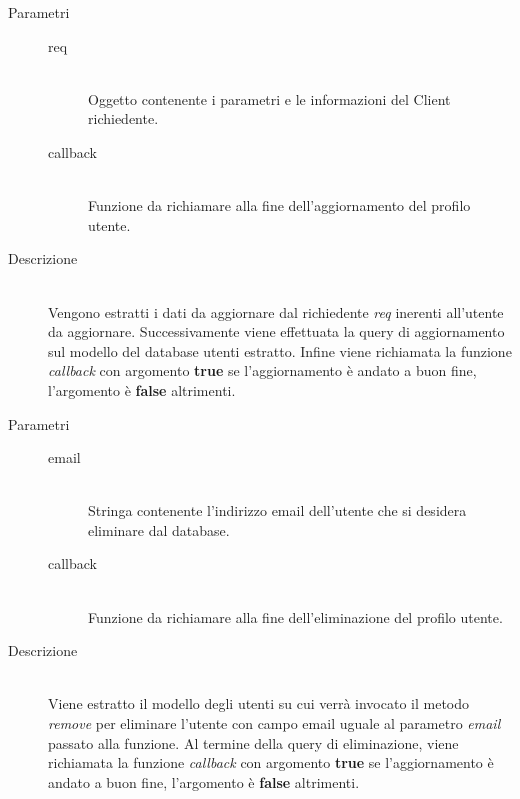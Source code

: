 \begin{description}
\begin{mldescription}
 		 \hfill
 			\begin{description}
 				\item[Parametri] \hfill
 					\begin{description}
 						\item[req] \hfill \\
 							Oggetto contenente i parametri e le informazioni del Client richiedente.
 						\item[callback] \hfill \\
 							Funzione da richiamare alla fine dell'aggiornamento del profilo utente.
 					\end{description}
 				\item[Descrizione] \hfill \\
 				Vengono estratti i dati da aggiornare dal richiedente \textit{req} inerenti all'utente da aggiornare. Successivamente viene effettuata la query di aggiornamento sul modello del database utenti estratto. Infine viene richiamata la funzione \textit{callback} con argomento \textbf{true} se l'aggiornamento è andato a buon fine, l'argomento è \textbf{false} altrimenti.
 			\end{description}
 			
 		 \hfill
 			\begin{description}
 				\item[Parametri] \hfill
 					\begin{description}
 						\item[email] \hfill \\
 							Stringa contenente l'indirizzo email dell'utente che si desidera eliminare dal database.
 						\item[callback] \hfill \\
 							Funzione da richiamare alla fine dell'eliminazione del profilo utente.
 					\end{description}
 				\item[Descrizione] \hfill \\
 				Viene estratto il modello degli utenti su cui verrà invocato il metodo \textit{remove} per eliminare l'utente con campo email uguale al parametro \textit{email} passato alla funzione. Al termine della query di eliminazione, viene richiamata la funzione \textit{callback} con argomento \textbf{true} se l'aggiornamento è andato a buon fine, l'argomento è \textbf{false} altrimenti.
 			\end{description}
 			
 	\end{mldescription}
\end{description}


